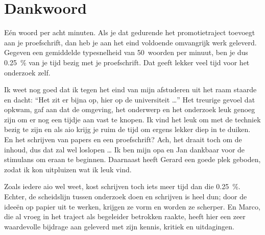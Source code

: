 \chapter*{Dankwoord}

\def\ppp{ \ldots\xspace}
\def\stick#1#2#3{\raisebox{#1}[0pt][0pt]{\rotatebox{#2}{#3}}\hspace{-.25ex}}

E\'en woord per acht minuten.
Als je dat gedurende het promotietraject toevoegt aan je proefschrift, dan heb je aan het eind voldoende omvangrijk werk geleverd.
Gegeven een gemiddelde typesnelheid van 50~woorden per minuut, ben je dus \SI[output-decimal-marker={,}]{.25}{\percent} van je tijd bezig met je proefschrift.
Dat geeft lekker veel tijd voor het onderzoek zelf.

Ik weet nog goed dat ik tegen het eind van mijn afstuderen uit het raam staarde en dacht: ``Het zit er bijna op, hier op de universiteit\ppp''
Het treurige gevoel dat opkwam, gaf aan dat de omgeving, het onderwerp en het onderzoek leuk genoeg zijn om er nog een tijdje aan vast te knopen.
Ik vind het leuk om met de techniek bezig te zijn en als aio krijg je ruim de tijd om ergens lekker diep in te duiken.
En het schrijven van papers en een proefschrift?
Ach, het draait toch om de inhoud, dus dat zal wel loslopen\ppp
Ik ben mijn opa en Jan dankbaar voor de stimulans om eraan te beginnen.
Daarnaast heeft Gerard een goede plek geboden, zodat ik kon uitpluizen wat ik leuk vind.

Zoals iedere aio wel weet, kost schrijven toch iets meer tijd dan die \SI[output-decimal-marker={,}]{.25}{\percent}.
Echter, de scheidslijn tussen onderzoek doen en schrijven is heel dun; door de idee\"en op papier uit te werken, krijgen ze vorm en worden ze scherper.
En Marco, die al vroeg in het traject als begeleider betrokken raakte, heeft hier een zeer waardevolle bijdrage aan geleverd met zijn kennis, kritiek en uitdagingen.

